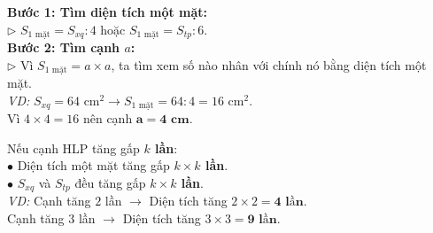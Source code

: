 \documentclass[14pt,a4paper,oneside]{extbook}
\begin{document}
\noindent
\begin{minipage}[t]{0.52\textwidth}
  \begin{tcolorbox}[
    enhanced,
    title={\footnotesize\bfseries\color{white}\faSearch\ 2. Tính cạnh $a$ khi biết diện tích},
    colback=teal!2!white,
    colframe=teal!75!black,
    arc=2.5mm, boxrule=0.8pt, top=1.8mm, bottom=1.8mm, left=2.2mm, right=2.2mm
  ]
    \footnotesize
    \textbf{Bước 1: Tìm diện tích một mặt:}\\
    $\triangleright$ $S_{1\text{ mặt}} = S_{xq} : 4$ \quad hoặc \quad $S_{1\text{ mặt}} = S_{tp} : 6$.\\
    \textbf{Bước 2: Tìm cạnh $a$:}\\
    $\triangleright$ Vì $S_{1\text{ mặt}} = a \times a$, ta tìm xem số nào nhân với chính nó bằng diện tích một mặt.\\
    \textit{VD:} $S_{xq} = 64\text{ cm}^2 \rightarrow S_{1\text{ mặt}} = 64:4 = 16\text{ cm}^2$.\\
    Vì $4 \times 4 = 16$ nên cạnh $\mathbf{a = 4\text{ cm}}$.
  \end{tcolorbox}
\end{minipage}%
\hfill
\begin{minipage}[t]{0.46\textwidth}
  \begin{tcolorbox}[
    enhanced,
    title={\footnotesize\bfseries\color{white}\faSliders\ 3. Tỉ lệ tăng cạnh và diện tích},
    colback=purple!2!white,
    colframe=purple!70!black,
    arc=2.5mm, boxrule=0.8pt, top=1.8mm, bottom=1.8mm, left=2mm, right=2mm
  ]
    \footnotesize
    Nếu cạnh HLP tăng gấp \textbf{$k$ lần}:\\
    $\bullet$ Diện tích một mặt tăng gấp \textbf{$k \times k$ lần}.\\
    $\bullet$ $S_{xq}$ và $S_{tp}$ đều tăng gấp \textbf{$k \times k$ lần}.\\
    \textit{VD:} Cạnh tăng $2$ lần $\rightarrow$ Diện tích tăng $2 \times 2 = \mathbf{4\text{ lần}}$.\\
    Cạnh tăng $3$ lần $\rightarrow$ Diện tích tăng $3 \times 3 = \mathbf{9\text{ lần}}$.
  \end{tcolorbox}
\end{minipage}

\vspace{3mm}
\end{document}
